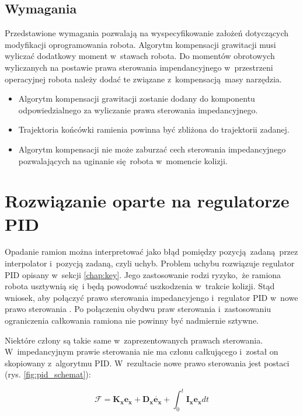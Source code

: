 \subsection{Wymagania}
Przedstawione wymagania pozwalają na wyspecyfikowanie założeń dotyczących modyfikacji oprogramowania robota. Algorytm kompensacji grawitacji musi wyliczać dodatkowy moment w~stawach robota. Do momentów obrotowych wyliczanych na postawie  prawa sterowania impendancyjnego w~przestrzeni operacyjnej robota należy dodać te związane z~kompensacją masy narzędzia.
\begin{itemize}
	\item Algorytm kompensacji grawitacji zostanie dodany do komponentu odpowiedzialnego za wyliczanie prawa sterowania impedancyjnego.
	\item Trajektoria końcówki ramienia powinna być zbliżona do trajektorii zadanej.
	\item Algorytm kompensacji nie może zaburzać cech sterowania impedancyjnego pozwalających na uginanie się robota w~momencie kolizji.
\end{itemize}



\section{Rozwiązanie oparte na regulatorze PID}
\label{chap:rozw_pid}
Opadanie ramion można interpretować jako błąd pomiędzy pozycją zadaną przez interpolator i~pozycją zadaną, czyli uchyb. Problem uchybu rozwiązuje regulator PID opisany w~sekcji \ref{chap:key}. Jego zastosowanie rodzi ryzyko, że ramiona robota usztywnią się i będą powodować uszkodzenia w~trakcie kolizji. Stąd wniosek, aby połączyć prawo sterowania impedancyjengo i~regulator PID w~nowe prawo sterowania \cite{bib:gravity2, bib:rozw_pid1}. Po połączeniu obydwu praw sterowania i~zastosowaniu ograniczenia całkowania ramiona nie powinny być nadmiernie sztywne. 

Niektóre człony są takie same w~zaprezentowanych prawach sterowania. W~impedancyjnym prawie sterowania nie ma członu całkującego i~został on skopiowany z~algorytmu PID. W~rezultacie nowe prawo sterowania jest postaci (rys. \ref{fig:pid_schemat}):

\begin{equation}
\label{eq:prawo_ster}
\boldsymbol{\mathcal{F}} = \boldsymbol{K_x}\boldsymbol{e_x} + \boldsymbol{D_x}\dot{\boldsymbol{e_x}} + \int_{0}^{t}  \boldsymbol{I_x}\boldsymbol{e_x}dt
\end{equation}

